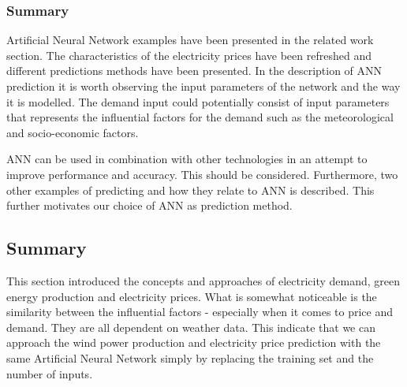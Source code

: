 \subsubsection{Summary}
Artificial Neural Network examples have been presented in the related work section. The characteristics of the electricity prices have been refreshed and different predictions methods have been presented. 
In the description of ANN prediction it is worth observing the input parameters of the network and the way it is modelled. The demand input could potentially consist of input parameters that represents the influential factors for the demand such as the meteorological and socio-economic factors.

ANN can be used in combination with other technologies in an attempt to improve performance and accuracy. This should be considered.
Furthermore, two other examples of predicting and how they relate to ANN is described. This further motivates our choice of ANN as prediction method.   

\subsection{Summary}
This section introduced the concepts and approaches of electricity demand, green energy production and electricity prices. What is somewhat noticeable is the similarity between the influential factors - especially when it comes to price and demand. They are all dependent on weather data. This indicate that we can approach the wind power production and electricity price prediction with the same Artificial Neural Network simply by replacing the training set and the number of inputs.